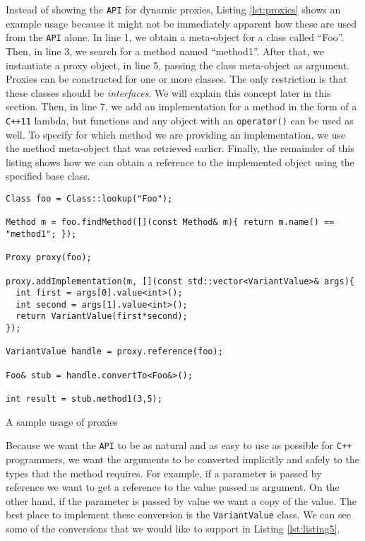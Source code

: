 Instead of showing the \texttt{API} for dynamic proxies, Listing \ref{lst:proxies} shows an example
usage because it might not be immediately apparent how these are used from the \texttt{API} alone.
In line 1, we obtain a meta-object for a class called ``Foo''. Then, in line 3, we search for a
method named ``method1''. After that, we instantiate a proxy object, in line 5, passing the class
meta-object as argument. Proxies can be constructed for one or more classes. The only restriction is
that these classes should be \emph{interfaces}. We will explain this concept later in this section.
Then, in line 7, we add an implementation for a method in the form of a \texttt{C++11} lambda, but functions
and any object with an \texttt{operator()} can be used as well. To specify for which method we are
providing an implementation, we use the method meta-object that was retrieved earlier.
Finally, the remainder of this listing shows how we can obtain a reference to the implemented object
using the specified base class.

\begin{listing}
\begin{verbatim}
Class foo = Class::lookup("Foo");

Method m = foo.findMethod([](const Method& m){ return m.name() == "method1"; });

Proxy proxy(foo);

proxy.addImplementation(m, [](const std::vector<VariantValue>& args){
  int first = args[0].value<int>();
  int second = args[1].value<int>();
  return VariantValue(first*second);
});

VariantValue handle = proxy.reference(foo);

Foo& stub = handle.convertTo<Foo&>();

int result = stub.method1(3,5);
\end{verbatim}
\caption{A sample usage of proxies}
\label{lst:proxies}
\end{listing}

Because we want the \texttt{API} to be as natural and as easy to use as possible for \texttt{C++} programmers,
we want the arguments to be converted implicitly and safely to the types that the method requires.
For example, if a parameter is passed by reference we want to get a reference to the value passed as argument.
On the other hand, if the parameter is passed by value we want a copy of the value. The best place to implement
these conversion is the \texttt{VariantValue} class. We can see some of the conversions that we would like to
support in Listing \ref{lst:listing5}.

